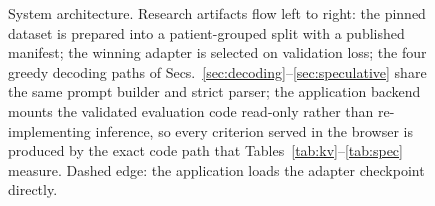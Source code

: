 \documentclass[conference]{IEEEtran}
\begin{document}
\begin{figure}[t]
\caption{System architecture. Research artifacts flow left to right:
the pinned dataset is prepared into a patient-grouped split with a
published manifest; the winning adapter is selected on validation
loss; the four greedy decoding paths of
Secs.~\ref{sec:decoding}--\ref{sec:speculative} share the same
prompt builder and strict parser; the application backend mounts
the validated evaluation code read-only rather than
re-implementing inference, so every criterion served in the
browser is produced by the exact code path that
Tables~\ref{tab:kv}--\ref{tab:spec} measure. Dashed edge: the
application loads the adapter checkpoint directly.}
\label{fig:arch}
\end{figure}
\end{document}

